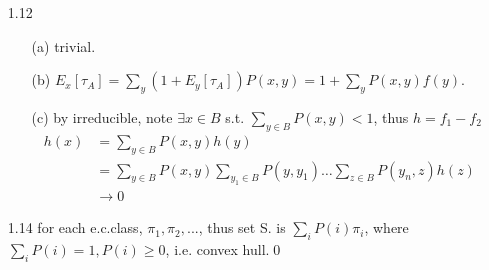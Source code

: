 \documentclass[paper=a4, fontsize=11pt]{scrartcl} %
\numberwithin{equation}{section} %
\numberwithin{figure}{section} %
\numberwithin{table}{section} %
\begin{document}
\begin{itemize}
	\item[1.12]
	\begin{itemize}
		\item[(a)] trivial.
		\item[(b)] $E_x[\tau_A] = \sum_y (1+E_y[\tau_A])P(x,y)= 1 + \sum_y P(x,y)f(y)$.
		\item[(c)] by irreducible, note $\exists x\in B$ s.t. $\sum_{y\in B}P(x,y)<1$, thus $h=f_1-f_2$
		\begin{align}
			h(x) &= \sum_{y\in B}P(x,y)h(y)\\
				&= \sum_{y\in B}P(x,y)\sum_{y_1\in B}P(y,y_1)\dots\sum_{z\in B}P(y_n,z)h(z)\\
				&\rightarrow 0
		\end{align}
	\end{itemize}
	\item[1.14] for each e.c.class, $\pi_1,\pi_2,...$, thus set S. is $\sum_i P(i)\pi_i$, where $\sum_i P(i)=1, P(i)\geq 0$, i.e. convex hull.\qed
\end{itemize}
\end{document}
